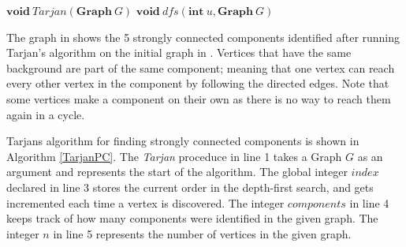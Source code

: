 \documentclass{l4proj}
\begin{document}

\begin{algorithm}[H]
\DontPrintSemicolon
\nl $\textbf{void} ~\mathit{Tarjan}(\textbf{Graph}~G)$ \;
\nl {}
\;
\nl $\textbf{void} ~\mathit{dfs}(\textbf{int}~u, \textbf{Graph}~G)$ \;
\nl {}
\caption{Tarjan\textquotesingle s algorithm \cite{tarjan1972depth} for finding the Strongly Connected Components of a Graph}
\label{TarjanPC}
\end{algorithm}

\noindent The graph in  shows the 5 strongly connected components identified after running Tarjan’s algorithm \cite{tarjan1972depth} on the initial graph in . Vertices that have the same background are part of the same component; meaning that one vertex can reach every other vertex in the component by following the directed edges. Note that some vertices make a component on their own as there is no way to reach them again in a cycle.

\noindent Tarjan\textquotesingle s algorithm \cite{tarjan1972depth} for finding strongly connected components is shown in Algorithm \ref{TarjanPC}. The \textit{Tarjan} proceduce in line 1 takes a Graph $G$ as an argument and represents the start of the algorithm. The global integer $index$ declared in line 3 stores the current order in the depth-first search, and gets incremented each time a vertex is discovered. The integer $components$ in line 4 keeps track of how many components were identified in the given graph. The integer $n$ in line 5 represents the number of vertices in the given graph.
\end{document}
